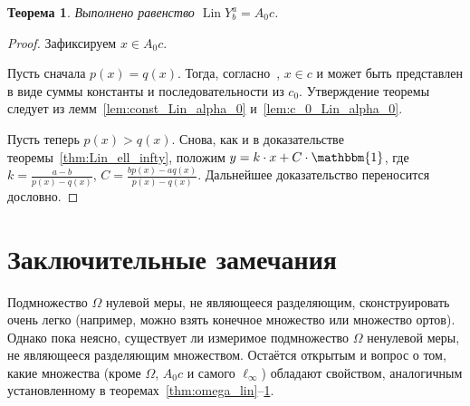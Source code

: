 \documentclass[a4paper,14pt]{article} %
\theoremstyle{plain}
\newtheorem{theorem}[lemma]{Теорема}
\begin{document}
\begin{theorem}
	\label{thm:A_0_c_infty_lin}
	Выполнено равенство $\operatorname{Lin} Y^a_b = A_0 c$.
\end{theorem}

\begin{proof}
	Зафиксируем $x \in A_0 c$.

	Пусть сначала $p(x) = q(x)$.
	Тогда, согласно~\cite[следствие 2]{our-mz2019ac0}, $x\in c$
	и может быть представлен в виде суммы константы и последовательности из $c_0$.
	Утверждение теоремы следует из лемм~\ref{lem:const_Lin_alpha_0} и~\ref{lem:c_0_Lin_alpha_0}.

	Пусть теперь $p(x) > q(x)$.
	Снова, как и в доказательстве теоремы~\ref{thm:Lin_ell_infty},
	положим $y=k\cdot x + C\cdot\mathbbm{1}$,
	где $k=\frac{a-b}{p(x)-q(x)}$, $C=\frac{bp(x)-aq(x)}{p(x)-q(x)}$.
	Дальнейшее доказательство переносится дословно.
\end{proof}



\section{Заключительные замечания}
Подмножество $\Omega$ нулевой меры, не являющееся разделяющим, сконструировать очень легко
(например, можно взять конечное множество или множество ортов).
Однако пока неясно, существует ли измеримое подмножество $\Omega$ ненулевой меры,
не являющееся разделяющим множеством.
Остаётся открытым и вопрос о том, какие множества (кроме $\Omega$, $A_0 c$ и самого $\ell_\infty$)
обладают свойством, аналогичным установленному в теоремах~\ref{thm:omega_lin}--\ref{thm:A_0_c_infty_lin}.


\printbibliography
\end{document}
